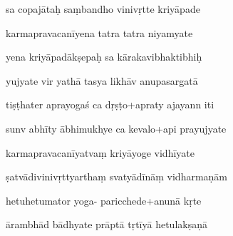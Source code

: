 \documentclass[article,12pt,a4paper]{memoir}%
\newcounter{parCount}
\begin{document}
	  
	  \pstart {} sa copajātaḥ saṃbandho vinivṛtte kriyāpade 
	{}
	\pend%
      

	  
	  \pstart \leavevmode%
	karmapravacanīyena tatra tatra niyamyate 
	{}
	\pend%
      

	  
	  \pstart {} yena kriyāpadākṣepaḥ sa kārakavibhaktibhiḥ 
	{}
	\pend%
      

	  
	  \pstart \leavevmode%
	yujyate vir yathā tasya likhāv anupasargatā 
	{}
	\pend%
      

	  
	  \pstart {} tiṣṭhater aprayogaś ca dṛṣṭo+apraty ajayann iti 
	{}
	\pend%
      

	  
	  \pstart \leavevmode%
	sunv abhīty ābhimukhye ca kevalo+api prayujyate 
	{}
	\pend%
      

	  
	  \pstart {} karmapravacanīyatvaṃ kriyāyoge vidhīyate 
	{}
	\pend%
      

	  
	  \pstart \leavevmode%
	ṣatvādivinivṛttyarthaṃ svatyādīnāṃ vidharmaṇām 
	{}
	\pend%
      

	  
	  \pstart {} hetuhetumator yoga- paricchede+anunā kṛte 
	{}
	\pend%
      

	  
	  \pstart \leavevmode%
	ārambhād bādhyate prāptā tṛtīyā hetulakṣaṇā 
	{}
	\pend%
      
\end{document}
